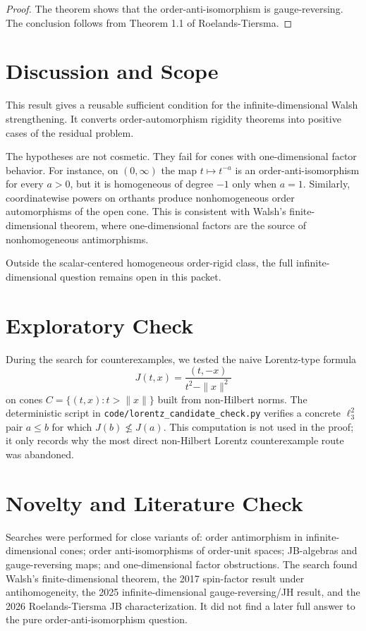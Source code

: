 \documentclass[11pt]{article}
\begin{document}
\begin{proof}
The theorem shows that the order-anti-isomorphism is gauge-reversing. The
conclusion follows from Theorem 1.1 of Roelands-Tiersma.
\end{proof}

\section*{Discussion and Scope}

This result gives a reusable sufficient condition for the infinite-dimensional
Walsh strengthening. It converts order-automorphism rigidity theorems into
positive cases of the residual problem.

The hypotheses are not cosmetic. They fail for cones with one-dimensional
factor behavior. For instance, on \((0,\infty)\) the map \(t\mapsto t^{-a}\) is
an order-anti-isomorphism for every \(a>0\), but it is homogeneous of degree
\(-1\) only when \(a=1\). Similarly, coordinatewise powers on orthants produce
nonhomogeneous order automorphisms of the open cone. This is consistent with
Walsh's finite-dimensional theorem, where one-dimensional factors are the
source of nonhomogeneous antimorphisms.

Outside the scalar-centered homogeneous order-rigid class, the full
infinite-dimensional question remains open in this packet.

\section*{Exploratory Check}

During the search for counterexamples, we tested the naive Lorentz-type formula
\[
  J(t,x)=\frac{(t,-x)}{t^2-\|x\|^2}
\]
on cones \(C=\{(t,x):t>\|x\|\}\) built from non-Hilbert norms. The deterministic
script in \texttt{code/lorentz\_candidate\_check.py} verifies a concrete
\(\ell_3^2\) pair \(a\le b\) for which \(J(b)\nleq J(a)\). This computation is
not used in the proof; it only records why the most direct non-Hilbert Lorentz
counterexample route was abandoned.

\section*{Novelty and Literature Check}

Searches were performed for close variants of: order antimorphism in
infinite-dimensional cones; order anti-isomorphisms of order-unit spaces;
JB-algebras and gauge-reversing maps; and one-dimensional factor obstructions.
The search found Walsh's finite-dimensional theorem, the 2017 spin-factor
result under antihomogeneity, the 2025 infinite-dimensional gauge-reversing/JH
result, and the 2026 Roelands-Tiersma JB characterization. It did not find a
later full answer to the pure order-anti-isomorphism question.
\end{document}
